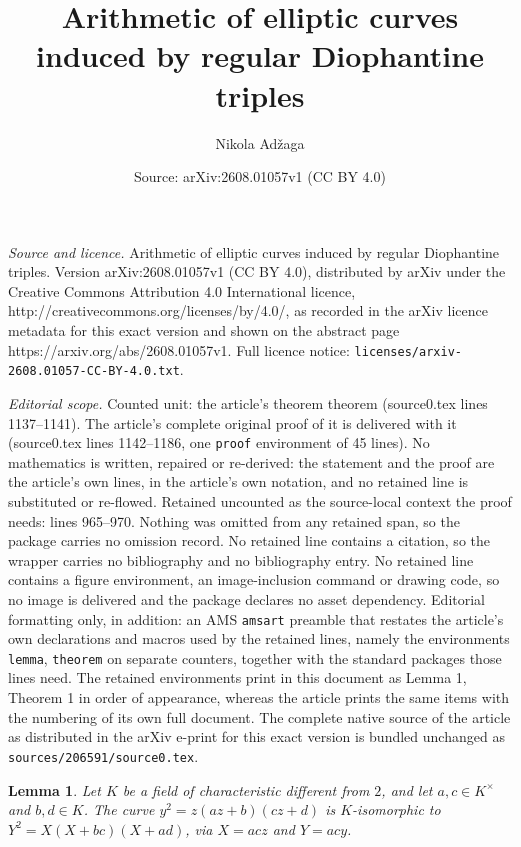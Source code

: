 \documentclass[10pt,a4paper]{amsart}
\title{\Large Arithmetic of elliptic curves induced by regular Diophantine triples}
\author{Nikola Ad\v{z}aga}
\date{Source: arXiv:2608.01057v1 (CC BY 4.0)}
\newtheorem{lemma}{Lemma}
\begin{document}
\maketitle

\noindent\emph{Source and licence.} \Large Arithmetic of elliptic curves induced by regular Diophantine triples. Version arXiv:2608.01057v1 (CC BY 4.0), distributed by arXiv under the Creative Commons Attribution 4.0 International licence, http://creativecommons.org/licenses/by/4.0/, as recorded in the arXiv licence metadata for this exact version and shown on the abstract page https://arxiv.org/abs/2608.01057v1. Full licence notice: \texttt{licenses/arxiv-2608.01057-CC-BY-4.0.txt}.\par\smallskip

\noindent\textit{Editorial scope.} Counted unit: the article's theorem theorem (source0.tex lines 1137--1141). The article's complete original proof of it is delivered with it (source0.tex lines 1142--1186, one \texttt{proof} environment of 45 lines). No mathematics is written, repaired or re-derived: the statement and the proof are the article's own lines, in the article's own notation, and no retained line is substituted or re-flowed.  Retained uncounted as the source-local context the proof needs: lines 965--970.  Nothing was omitted from any retained span, so the package carries no omission record.  No retained line contains a citation, so the wrapper carries no bibliography and no bibliography entry.  No retained line contains a figure environment, an image-inclusion command or drawing code, so no image is delivered and the package declares no asset dependency.  Editorial formatting only, in addition: an AMS \texttt{amsart} preamble that restates the article's own declarations and macros used by the retained lines, namely the environments \texttt{lemma}, \texttt{theorem} on separate counters, together with the standard packages those lines need.  The retained environments print in this document as Lemma 1, Theorem 1 in order of appearance, whereas the article prints the same items with the numbering of its own full document.  The complete native source of the article as distributed in the arXiv e-print for this exact version is bundled unchanged as \texttt{sources/206591/source0.tex}.
\begin{lemma}\label{lem:Qiso}
Let \(K\) be a field of characteristic different from \(2\), and let
\(a,c\in K^\times\) and \(b,d\in K\). The curve
\(y^2=z(az+b)(cz+d)\) is \(K\)-isomorphic to
\(Y^2=X(X+bc)(X+ad)\), via \(X=acz\) and \(Y=acy\).
\end{lemma}
\end{document}
